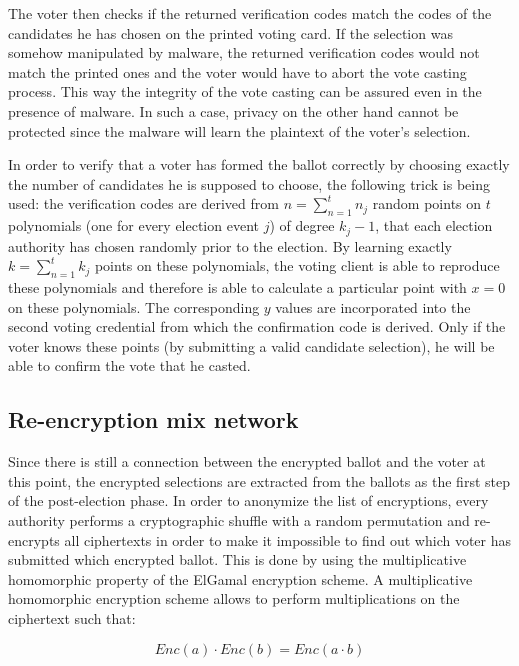 The voter then checks if the returned verification codes match the codes of the candidates he has chosen on the printed voting card. If the selection was somehow manipulated by malware, the returned verification codes would not match the printed ones and the voter would have to abort the vote casting process. This way the integrity of the vote casting can be assured even in the presence of malware. In such a case, privacy on the other hand cannot be protected since the malware will learn the plaintext of the voter's selection.

In order to verify that a voter has formed the ballot correctly by choosing exactly the number of candidates he is supposed to choose, the following trick is being used: the verification codes are derived from $n = \sum_{n=1}^{t} n_j$ random points on $t$ polynomials (one for every election event $j$) of degree $k_j - 1$, that each election authority has chosen randomly prior to the election. By learning exactly $k = \sum_{n=1}^{t} k_j$ points on these polynomials, the voting client is able to reproduce these polynomials and therefore is able to calculate a particular point with $x=0$ on these polynomials. The corresponding $y$ values are incorporated into the second voting credential from which the confirmation code is derived. Only if the voter knows these points (by submitting a valid candidate selection), he will be able to confirm the vote that he casted.

\subsection{Re-encryption mix network}

Since there is still a connection between the encrypted ballot and the voter at this point, the encrypted selections are extracted from the ballots as the first step of the post-election phase. In order to anonymize the list of encryptions, every authority performs a cryptographic shuffle with a random permutation and re-encrypts all ciphertexts in order to make it impossible to find out which voter has submitted which encrypted ballot. This is done by using the multiplicative homomorphic property of the ElGamal encryption scheme. A multiplicative homomorphic encryption scheme allows to perform multiplications on the ciphertext such that:

\begin{equation*}Enc(a) \cdot Enc(b) = Enc(a \cdot b)\end{equation*}

